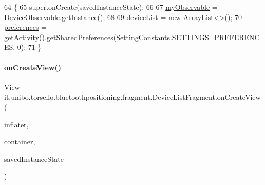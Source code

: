 \begin{DoxyCode}
64                                                               \{
65         super.onCreate(savedInstanceState);
66 
67         \hyperlink{classit_1_1unibo_1_1torsello_1_1bluetoothpositioning_1_1fragment_1_1DeviceListFragment_a6a78ac6c8b7bc5b91a5966c341305b62_a6a78ac6c8b7bc5b91a5966c341305b62}{myObservable} = DeviceObservable.\hyperlink{classit_1_1unibo_1_1torsello_1_1bluetoothpositioning_1_1observables_1_1DeviceObservable_ab16792c5848440646624b2a41553954a_ab16792c5848440646624b2a41553954a}{getInstance}();
68 
69         \hyperlink{classit_1_1unibo_1_1torsello_1_1bluetoothpositioning_1_1fragment_1_1DeviceListFragment_a19a4a9cff961d3c319aaa80d5412a9a6_a19a4a9cff961d3c319aaa80d5412a9a6}{deviceList} = \textcolor{keyword}{new} ArrayList<>();
70         \hyperlink{classit_1_1unibo_1_1torsello_1_1bluetoothpositioning_1_1fragment_1_1DeviceListFragment_a3f583494281dbe65b3e76c28b5facbe7_a3f583494281dbe65b3e76c28b5facbe7}{preferences} = getActivity().getSharedPreferences(SettingConstants.SETTINGS\_PREFERENCES, 
      0);
71     \}
\end{DoxyCode}
\hypertarget{classit_1_1unibo_1_1torsello_1_1bluetoothpositioning_1_1fragment_1_1DeviceListFragment_ae359841af9f15a6e1ccea49656a2c6aa_ae359841af9f15a6e1ccea49656a2c6aa}{}\label{classit_1_1unibo_1_1torsello_1_1bluetoothpositioning_1_1fragment_1_1DeviceListFragment_ae359841af9f15a6e1ccea49656a2c6aa_ae359841af9f15a6e1ccea49656a2c6aa} 
\paragraph{\texorpdfstring{on\+Create\+View()}{onCreateView()}}
{\footnotesize\ttfamily View it.\+unibo.\+torsello.\+bluetoothpositioning.\+fragment.\+Device\+List\+Fragment.\+on\+Create\+View (\begin{DoxyParamCaption}\item[{Layout\+Inflater}]{inflater,  }\item[{View\+Group}]{container,  }\item[{Bundle}]{saved\+Instance\+State }\end{DoxyParamCaption})}


